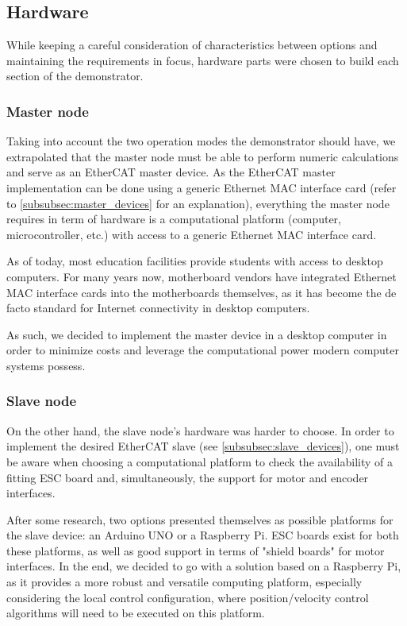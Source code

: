 \subsection{Hardware} \label{sec:proposed-hardware}

While keeping a careful consideration of characteristics between options and maintaining the requirements in focus, hardware parts were chosen to build each section of the demonstrator.

\subsubsection{Master node}

Taking into account the two operation modes the demonstrator should have, we extrapolated that the master node must be able to perform numeric calculations and serve as an EtherCAT master device.
As the EtherCAT master implementation can be done using a generic Ethernet MAC interface card (refer to \ref{subsubsec:master_devices} for an explanation), everything the master node requires in term of hardware is a computational platform (computer, microcontroller, etc.) with access to a generic Ethernet MAC interface card.

As of today, most education facilities provide students with access to desktop computers.
For many years now, motherboard vendors have integrated Ethernet MAC interface cards into the motherboards themselves, as it has become the de facto standard for Internet connectivity in desktop computers.

As such, we decided to implement the master device in a desktop computer in order to minimize costs and leverage the computational power modern computer systems possess.

\subsubsection{Slave node} \label{subsubsec:slave_hdw}

On the other hand, the slave node's hardware was harder to choose.
In order to implement the desired EtherCAT slave (see \ref{subsubsec:slave_devices}), one must be aware when choosing a computational platform to check the availability of a fitting ESC board and, simultaneously, the support for motor and encoder interfaces.

After some research, two options presented themselves as possible platforms for the slave device: an Arduino UNO or a Raspberry Pi.
ESC boards exist for both these platforms, as well as good support in terms of "shield boards" for motor interfaces.
In the end, we decided to go with a solution based on a Raspberry Pi, as it provides a more robust and versatile computing platform, especially considering the local control configuration, where position/velocity control algorithms will need to be executed on this platform.


